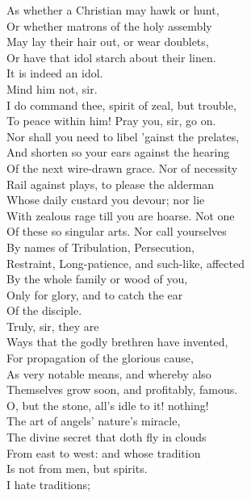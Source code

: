 \documentclass[a4paper,oneside]{memoir}
\begin{document}
\begin{drama*}
As whether a Christian may hawk or hunt,\\
Or whether matrons of the holy assembly\\
May lay their hair out, or wear doublets,\\
Or have that idol starch about their linen.\\
\ananiasspeaks It is indeed an idol.\\
\tribulationspeaks {} Mind him not, sir.\\
I do command thee, spirit of zeal, but trouble,\\
To peace within him! Pray you, sir, go on.\\
\subtlespeaks Nor shall you need to libel 'gainst the prelates,\\
And shorten so your ears against the hearing\\
Of the next wire-drawn grace. Nor of necessity\\
Rail against plays, to please the alderman\\
Whose daily custard you devour; nor lie\\
With zealous rage till you are hoarse. Not one\\
Of these so singular arts. Nor call yourselves\\
By names of Tribulation, Persecution,\\
Restraint, Long-patience, and such-like, affected\\
By the whole family or wood of you,\\
Only for glory, and to catch the ear\\
Of the disciple.\\
\tribulationspeaks {} Truly, sir, they are\\
Ways that the godly brethren have invented,\\
For propagation of the glorious cause,\\
As very notable means, and whereby also\\
Themselves grow soon, and profitably, famous.\\
\subtlespeaks O, but the stone, all's idle to it! nothing!\\
The art of angels' nature's miracle,\\
The divine secret that doth fly in clouds\\
From east to west: and whose tradition\\
Is not from men, but spirits.\\
\ananiasspeaks {} I hate traditions;\\

\end{drama*}
\end{document}
